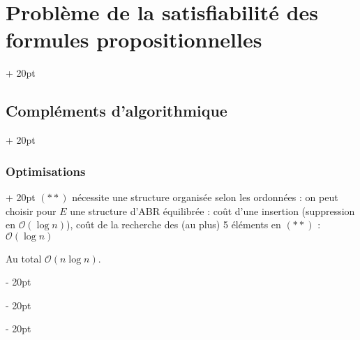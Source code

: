 \documentclass[a4paper, 12pt, twoside]{article}
\newcommand{\ind}[1][20pt]{\advance\leftskip + #1}
\newcommand{\deind}[1][20pt]{\advance\leftskip - #1}
\newenvironment{indt}[2][20pt]{#2 \par \ind[#1]}{\par \deind} %
\begin{document}
\begin{indt}{\section{Problème de la satisfiabilité des formules propositionnelles}}
\begin{indt}{\subsection{Compléments d'algorithmique}}
\begin{indt}{\subsubsection{Optimisations}}
                $(**)$ nécessite une structure organisée selon les ordonnées : on peut choisir pour $E$ une structure d'ABR équilibrée : coût d'une insertion (suppression en $\mathcal O(\log n)$), coût de la recherche des (au plus) 5 éléments en $(**)$ : $\mathcal O(\log n)$ 
                
                Au total $\mathcal O(n \log n)$.
            \end{indt}
        \end{indt}
        
    \end{indt}
    
    
    
\end{document}
